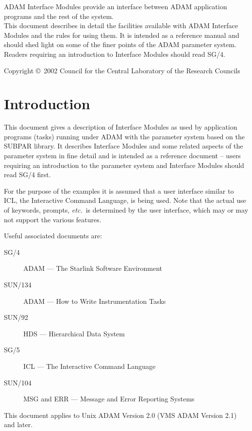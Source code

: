 \documentclass[twoside,11pt]{article}
\newcommand{\stardocinitials}  {SUN}
\newcommand{\stardoccopyright} 
{Copyright \copyright\ 2002 Council for the Central Laboratory of the Research Councils}
\newcommand{\stardocnumber}    {115.3}
\newcommand{\stardocabstract}  {
ADAM Interface Modules provide an interface between ADAM application programs 
and the rest of the system.
\\
This document describes in detail the facilities available with ADAM Interface
Modules and the rules for using them. It is intended as a reference manual and
should shed light on some of the finer points of the ADAM parameter system.
Readers requiring an introduction to Interface Modules should read
\xref{SG/4}{sg4}{}.
}
\newcommand{\stardocname}{\stardocinitials /\stardocnumber}
\newenvironment{latexonly}{}{}
\newcommand{\xref}[3]{#1}
\newcommand{\xlabel}[1]{}
\renewcommand{\_}{\texttt{\symbol{95}}}
\renewcommand{\thepage}{\roman{page}}
\begin{document}
\stardocabstract

\begin{latexonly}
\newpage
\vspace*{\fill}
\stardoccopyright
\end{latexonly}

  \newpage
  \begin{latexonly}
    \setlength{\parskip}{0mm}
    \tableofcontents
    \setlength{\parskip}{\medskipamount}
    \markboth{\stardocname}{\stardocname}
  \end{latexonly}

\cleardoublepage
\renewcommand{\thepage}{\arabic{page}}
\setcounter{page}{1}


\section{Introduction\xlabel{introduction}}
This document gives a description of Interface Modules as used by
application programs (tasks) running under ADAM with the parameter system
based on the SUBPAR library.
It describes Interface Modules and some related aspects of the parameter 
system in fine detail and is intended as a reference document -- 
users requiring an introduction to the parameter system and Interface Modules 
should read \xref{SG/4}{sg4}{} first.

For the purpose of the examples it is assumed that a user interface
similar to ICL, the Interactive Command Language, is being used.
Note that the actual use of keywords, prompts, {\em etc.}\ is 
determined by the user interface, which may or may not support the
various features. 

Useful associated documents are:
\begin{description}
\item[\xref{SG/4}{sg4}{}] ADAM --- The Starlink Software Environment
\item[\xref{SUN/134}{sun134}{}] ADAM --- How to Write Instrumentation Tasks
\item[\xref{SUN/92}{sun92}{}] HDS --- Hierarchical Data System
\item[\xref{SG/5}{sg5}{}] ICL --- The Interactive Command Language
\item[\xref{SUN/104}{sun104}{}] MSG and ERR --- Message and Error Reporting
Systems
\end{description}
This document applies to Unix ADAM Version 2.0 (VMS ADAM Version 2.1) and 
later.
\end{document}
